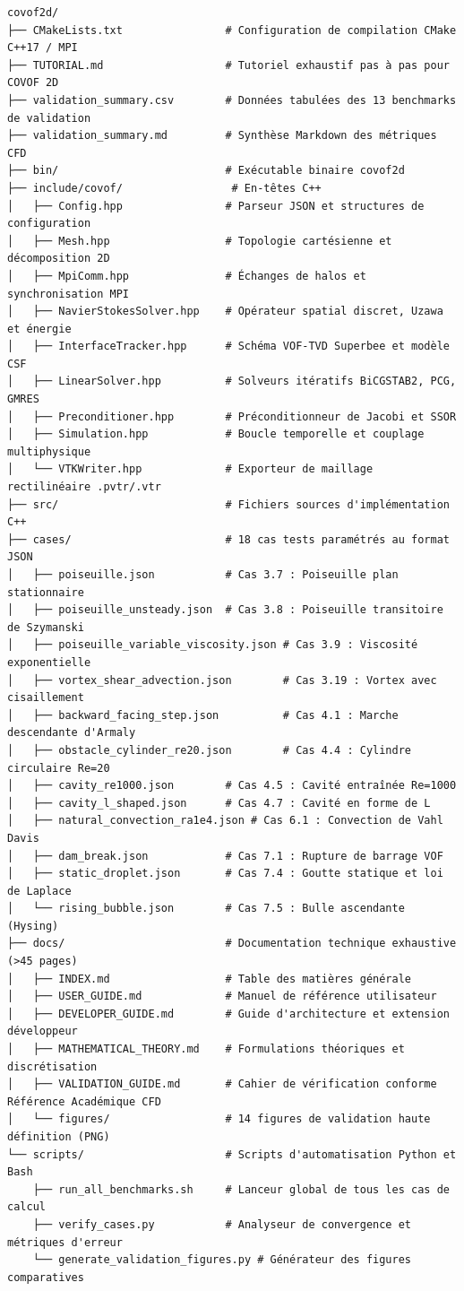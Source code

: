 \documentclass[
  french,
]{article}
\begin{document}
\begin{verbatim}
covof2d/
├── CMakeLists.txt                # Configuration de compilation CMake C++17 / MPI
├── TUTORIAL.md                   # Tutoriel exhaustif pas à pas pour COVOF 2D
├── validation_summary.csv        # Données tabulées des 13 benchmarks de validation
├── validation_summary.md         # Synthèse Markdown des métriques CFD
├── bin/                          # Exécutable binaire covof2d
├── include/covof/                 # En-têtes C++
│   ├── Config.hpp                # Parseur JSON et structures de configuration
│   ├── Mesh.hpp                  # Topologie cartésienne et décomposition 2D
│   ├── MpiComm.hpp               # Échanges de halos et synchronisation MPI
│   ├── NavierStokesSolver.hpp    # Opérateur spatial discret, Uzawa et énergie
│   ├── InterfaceTracker.hpp      # Schéma VOF-TVD Superbee et modèle CSF
│   ├── LinearSolver.hpp          # Solveurs itératifs BiCGSTAB2, PCG, GMRES
│   ├── Preconditioner.hpp        # Préconditionneur de Jacobi et SSOR
│   ├── Simulation.hpp            # Boucle temporelle et couplage multiphysique
│   └── VTKWriter.hpp             # Exporteur de maillage rectilinéaire .pvtr/.vtr
├── src/                          # Fichiers sources d'implémentation C++
├── cases/                        # 18 cas tests paramétrés au format JSON
│   ├── poiseuille.json           # Cas 3.7 : Poiseuille plan stationnaire
│   ├── poiseuille_unsteady.json  # Cas 3.8 : Poiseuille transitoire de Szymanski
│   ├── poiseuille_variable_viscosity.json # Cas 3.9 : Viscosité exponentielle
│   ├── vortex_shear_advection.json        # Cas 3.19 : Vortex avec cisaillement
│   ├── backward_facing_step.json          # Cas 4.1 : Marche descendante d'Armaly
│   ├── obstacle_cylinder_re20.json        # Cas 4.4 : Cylindre circulaire Re=20
│   ├── cavity_re1000.json        # Cas 4.5 : Cavité entraînée Re=1000
│   ├── cavity_l_shaped.json      # Cas 4.7 : Cavité en forme de L
│   ├── natural_convection_ra1e4.json # Cas 6.1 : Convection de Vahl Davis
│   ├── dam_break.json            # Cas 7.1 : Rupture de barrage VOF
│   ├── static_droplet.json       # Cas 7.4 : Goutte statique et loi de Laplace
│   └── rising_bubble.json        # Cas 7.5 : Bulle ascendante (Hysing)
├── docs/                         # Documentation technique exhaustive (>45 pages)
│   ├── INDEX.md                  # Table des matières générale
│   ├── USER_GUIDE.md             # Manuel de référence utilisateur
│   ├── DEVELOPER_GUIDE.md        # Guide d'architecture et extension développeur
│   ├── MATHEMATICAL_THEORY.md    # Formulations théoriques et discrétisation
│   ├── VALIDATION_GUIDE.md       # Cahier de vérification conforme Référence Académique CFD
│   └── figures/                  # 14 figures de validation haute définition (PNG)
└── scripts/                      # Scripts d'automatisation Python et Bash
    ├── run_all_benchmarks.sh     # Lanceur global de tous les cas de calcul
    ├── verify_cases.py           # Analyseur de convergence et métriques d'erreur
    └── generate_validation_figures.py # Générateur des figures comparatives
\end{verbatim}
\end{document}

